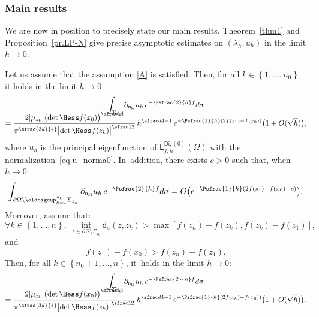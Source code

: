 \subsubsection{Main results}
\label{ssec.mainresu}
We are now in position to precisely state our main results. Theorem~\ref{thm1} and Proposition~\ref{pr.LP-N} give precise
asymptotic estimates on $(\lambda_h,u_h)$ in the limit $h \to 0$.
\begin{theorem}\label{thm1}
Let us assume that the assumption \ref{A} is satisfied. Then, for all $k\in \left\{1,\ldots,n_0\right\}$ it holds in the limit $h\to 0$\vspace*{-5pt}
\begin{multline}\label{eq.dnuh_asymptot}
\int_{\Sigma_{z_k}}\partial_{\mathsf n_\Omega} u_h \, e^{-\Psfrac{2}{h} f} d\sigma\\[-10pt]
= \frac{ 2\vert \mu_{z_k}\vert \bigl(\det \Hess f (x_0) \bigr)^{\sfrac14} }{ \pi^{\sfrac{3d}{4}}\bigl\vert \det \Hess f (z_k) \bigr\vert^{\sfrac12}} \, h^{\sfrac d4 -1} \,e^{-\Psfrac{1}{h}(2f(z_1)-f(x_0))}\bigl(1+ O({\sqrt h}) \bigr),
\end{multline}
where $u_h$ is the principal eigenfunction of $\mathsf L^{\mathsf{Di},(0)}_{f,h}(\Omega)$ with the normalization~\eqref{eq.u_norma0}. In~addition, there exists $c>0$ such that, when $h\to 0$\vspace*{-3pt}
\begin{equation}\label{eq.dnuh_asymptot2}
\int_{\partial \Omega \setminus \oldbigcup_{k=1}^{n_0}\Sigma_{z_k}} \partial_{\mathsf n_\Omega} u_h \, e^{-\Psfrac{2}{h} f} d\sigma= O\bigl(e^{-\Psfrac{1}{h}(2f(z_1)-f(x_0)+c)} \bigr).
\end{equation}
Moreover, assume that:\vspace*{-3pt}
\begin{equation}
\label{hypo1}
\forall k\in \left\{1,\ldots,n\right\}, \ \inf_{z\in \partial \Omega\setminus \Gamma_{z_k}} \mathsf d_a(z,z_k) >\max[f(z_n)-f(z_k),f(z_k)-f(z_1)],
\end{equation}
and\vspace*{-3pt}
\begin{equation}
\label{hypo2}
f(z_1)-f(x_0)>f(z_n)-f(z_1).
\end{equation}
Then, for all $k\in \left\{n_0+1,\ldots,n\right\}$, it~holds in the limit $h\to 0$:\vspace*{-5pt}
\begin{multline}\label{eq.dnuh_asymptot3}
\int_{\Sigma_{z_k}}\partial_{\mathsf n_\Omega} u_h \,
e^{-\Psfrac{2}{h} f} d\sigma\\[-10pt]
=\frac{ 2\vert \mu_{z_k}\vert \bigl(\det \Hess f (x_0) \bigr)^{\sfrac14} }{ \pi^{\sfrac{3d}{4}}\bigl\vert \det \Hess f (z_k) \bigr\vert^{\sfrac12}} \, h^{\sfrac d4 -1} \,e^{-\Psfrac{1}{h}(2f(z_k)-f(x_0))}\bigl(1+ O({\sqrt h}) \bigr).
\end{multline}
\end{theorem}

